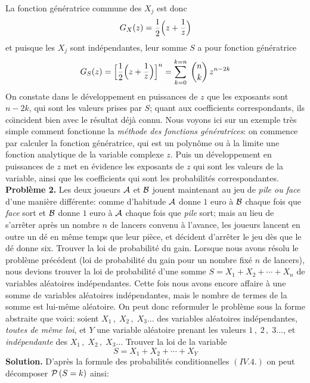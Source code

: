 \medskip
La fonction g\'en\'eratrice commune des $X_j$ est donc
$$G_X (z) = {1\over 2} \Bigl( z + {1\over\ldown{z}} \Bigr)$$
et puisque les $X_j$ sont ind\'ependantes, leur somme $S$ a pour
fonction g\'en\'eratrice
$$G_S (z) = \Bigl[ {1\over 2} \Bigl( z + {1\over\ldown{z}} 
\Bigr) \Bigr]^n = \sum_{k=0}^{k=n}\; {n \choose k}\, z^{n-2k}$$
On constate dans le d\'eveloppement en puissances de $z$ que les
exposants sont $n-2k$, qui sont les valeurs prises par $S$; quant aux
coefficients correspondants, ils co{\"\i}ncident bien avec le r\'esultat
d\'ej\`a connu.
\medskip
Nous voyons ici sur un exemple tr\`es simple comment fonctionne la 
{\it m\'ethode des fonctions g\'en\'eratrices}:  on commence par 
calculer la fonction g\'en\'eratrice,  qui est un polyn\^ome ou \`a la
limite une fonction analytique de la variable complexe $z$.  Puis un
d\'eveloppement en puissances de $z$ met en \'evidence les exposants
de $z$ qui sont les valeurs de la variable,  ainsi que les coefficients 
qui sont les probabilit\'es correspondantes.
\bigskip
{\bf Probl\`eme 2.}  Les deux joueurs ${\cal A}$ et ${\cal B}$ jouent
maintenant au jeu de {\it pile ou face} d'une mani\`ere diff\'erente: 
comme d'habitude ${\cal A}$ donne $1$ euro \`a ${\cal B}$ chaque fois
que {\it face} sort et ${\cal  B}$ donne $1$ euro \`a ${\cal A}$ chaque
fois que {\it pile} sort;  mais au  lieu de  s'arr\^eter apr\`es un nombre 
$n$ de lancers convenu \`a l'avance,  les joueurs lancent en outre un d\'e 
en m\^eme temps que leur pi\`ece, et d\'ecident d'arr\^eter le jeu d\`es
que le d\'e donne six. 
\smallskip
Trouver la loi de probabilit\'e du gain.
\medskip
Lorsque nous avons r\'esolu le probl\`eme pr\'ec\'edent  (loi de 
probabilit\'e du gain pour un nombre fix\'e $n$ de lancers), nous devions
trouver la loi de  probabilit\'e d'une somme $S = X_1 + X_2 + \cdots +
X_n$ de variables al\'eatoires ind\'ependantes. Cette fois nous avons
encore affaire \`a une somme de variables al\'eatoires ind\'ependantes,
mais le nombre de termes  de la somme est lui-m\^eme al\'eatoire.
\smallskip
On peut donc reformuler le probl\`eme sous la forme abstraite que voici:
soient $X_1\, , \; X_2\, , \; X_3 \ldots$ des variables al\'eatoires
ind\'ependantes, {\it toutes de m\^eme loi}, et $Y$ une variable 
al\'eatoire prenant les valeurs $1\, , \; 2\, , \; 3 \ldots$, et {\it
ind\'ependante} des  $X_1\, , \; X_2\, , \; X_3 \ldots$ 
Trouver la loi de la variable 
$$S = X_1 + X_2 + \cdots + X_Y$$
\medskip
{\bf Solution.} D'apr\`es la formule des probabilit\'es conditionnelles
$(IV.4.)$ on peut d\'ecom\-poser ${\cal P}\, (S = k)$ ainsi:
